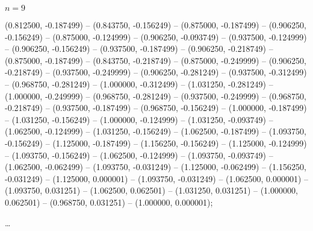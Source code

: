 \begin{zzfrac}{$n = 9$}
\begin{scope}[shift={(0,0.5)}]
  (0.812500, -0.187499)  --
  (0.843750, -0.156249)  --
  (0.875000, -0.187499)  --
  (0.906250, -0.156249)  --
  (0.875000, -0.124999)  --
  (0.906250, -0.093749)  --
  (0.937500, -0.124999)  --
  (0.906250, -0.156249)  --
  (0.937500, -0.187499)  --
  (0.906250, -0.218749)  --
  (0.875000, -0.187499)  --
  (0.843750, -0.218749)  --
  (0.875000, -0.249999)  --
  (0.906250, -0.218749)  --
  (0.937500, -0.249999)  --
  (0.906250, -0.281249)  --
  (0.937500, -0.312499)  --
  (0.968750, -0.281249)  --
  (1.000000, -0.312499)  --
  (1.031250, -0.281249)  --
  (1.000000, -0.249999)  --
  (0.968750, -0.281249)  --
  (0.937500, -0.249999)  --
  (0.968750, -0.218749)  --
  (0.937500, -0.187499)  --
  (0.968750, -0.156249)  --
  (1.000000, -0.187499)  --
  (1.031250, -0.156249)  --
  (1.000000, -0.124999)  --
  (1.031250, -0.093749)  --
  (1.062500, -0.124999)  --
  (1.031250, -0.156249)  --
  (1.062500, -0.187499)  --
  (1.093750, -0.156249)  --
  (1.125000, -0.187499)  --
  (1.156250, -0.156249)  --
  (1.125000, -0.124999)  --
  (1.093750, -0.156249)  --
  (1.062500, -0.124999)  --
  (1.093750, -0.093749)  --
  (1.062500, -0.062499)  --
  (1.093750, -0.031249)  --
  (1.125000, -0.062499)  --
  (1.156250, -0.031249)  --
  (1.125000, 0.000001)   --
  (1.093750, -0.031249)  --
  (1.062500, 0.000001)   --
  (1.093750, 0.031251)   --
  (1.062500, 0.062501)   --
  (1.031250, 0.031251)   --
  (1.000000, 0.062501)   --
  (0.968750, 0.031251)   --
  (1.000000, 0.000001);
\end{scope}
\end{zzfrac}
%
\zzfracskip \dots
%
